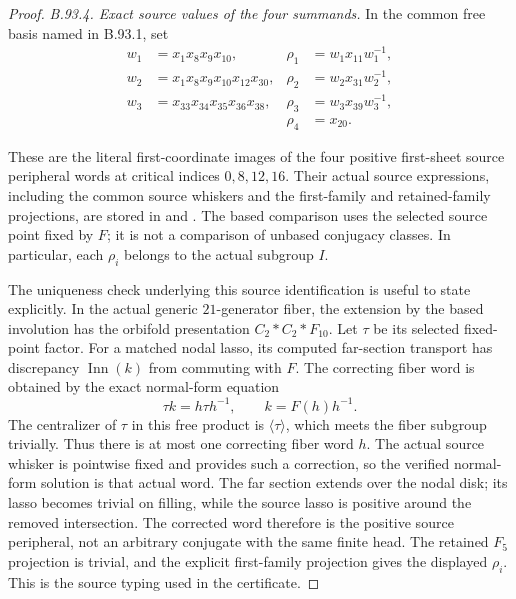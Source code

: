\begin{proof}
\emph{B.93.4. Exact source values of the four summands.}
In the common free basis named in B.93.1, set
\[
 \begin{aligned}
 w_1&=x_1x_8x_9x_{10},&\rho_1&=w_1x_{11}w_1^{-1},\\
 w_2&=x_1x_8x_9x_{10}x_{12}x_{30},&
                  \rho_2&=w_2x_{31}w_2^{-1},\\
 w_3&=x_{33}x_{34}x_{35}x_{36}x_{38},&
                  \rho_3&=w_3x_{39}w_3^{-1},\\
 &&\rho_4&=x_{20}.
 \end{aligned}
\]
\begingroup\raggedright
These are the literal first-coordinate images of the four positive
first-sheet source peripheral words at critical indices $0,8,12,16$.
Their actual source expressions, including the common source
whiskers and the first-family and retained-family projections, are
stored in
and
.
The based comparison uses the selected source point fixed by $F$;
it is not a comparison of unbased conjugacy classes. In particular,
each $\rho_i$ belongs to the actual subgroup $I$.\par
\endgroup

The uniqueness check underlying this source identification is useful
to state explicitly. In the actual generic $21$-generator fiber,
the extension by the based involution has the orbifold presentation
$C_2*C_2*F_{10}$. Let $\tau$ be its selected fixed-point factor.
For a matched nodal lasso, its computed far-section transport has
discrepancy $\operatorname{Inn}(k)$ from commuting with $F$.
The correcting fiber word is obtained by the exact normal-form
equation
\[
                         \tau k=h\tau h^{-1},
                         \qquad k=F(h)h^{-1}.
\]
The centralizer of $\tau$ in this free product is $\langle\tau\rangle$,
which meets the fiber subgroup trivially. Thus there is at most
one correcting fiber word $h$. The actual source whisker is
pointwise fixed and provides such a correction, so the verified
normal-form solution is that actual word. The far section extends
over the nodal disk; its lasso becomes trivial on filling, while
the source lasso is positive around the removed intersection.
The corrected word therefore is the positive source peripheral,
not an arbitrary conjugate with the same finite head. The retained
$F_5$ projection is trivial, and the explicit first-family
projection gives the displayed $\rho_i$. This is the source
typing used in the certificate.


\end{proof}
